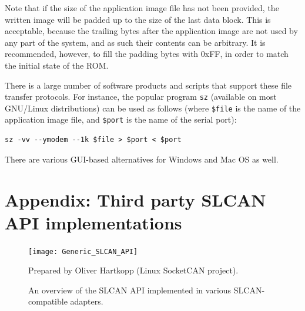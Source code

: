 \documentclass{zubaxdoc}
\begin{document}
Note that if the size of the application image file has not been provided,
the written image will be padded up to the size of the last data block.
This is acceptable, because the trailing bytes after the application image are
not used by any part of the system, and as such their contents can be arbitrary.
It is recommended, however, to fill the padding bytes with 0xFF,
in order to match the initial state of the ROM.

There is a large number of software products and scripts that support these file transfer protocols.
For instance, the popular program \verb|sz| (available on most GNU/Linux distributions) can be used as follows
(where \verb|$file| is the name of the application image file, and \verb|$port| is the name of the serial port):
\begin{verbatim}
sz -vv --ymodem --1k $file > $port < $port
\end{verbatim}
There are various GUI-based alternatives for Windows and Mac OS as well.

%
%
\appendix
\chapter{Appendix: Third party SLCAN API implementations}\label{appendix:slcan_api_overview}

\begin{figure}[hbtp]
    \centering
    \centerline{\texttt{[image: Generic\_SLCAN\_API]}}
    \caption{An overview of the SLCAN API implemented in various SLCAN-compatible adapters.
    \label{fig:Generic_SLCAN_API}}
    Prepared by Oliver Hartkopp (Linux SocketCAN project).
\end{figure}
\end{document}
